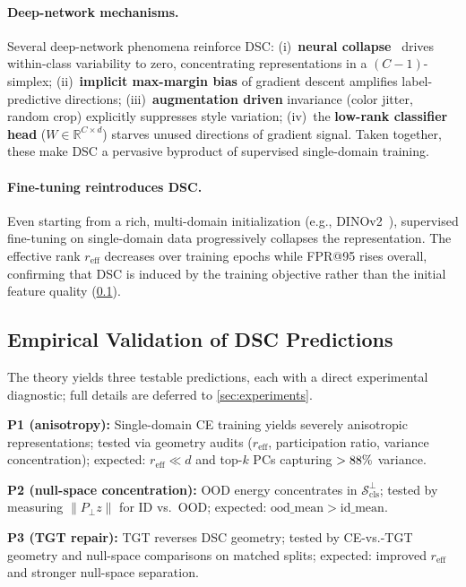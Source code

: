 \documentclass[runningheads]{llncs}
\begin{document}
\paragraph{Deep-network mechanisms.}
Several deep-network phenomena reinforce DSC:
(i)~\textbf{neural collapse}~\cite{Papyan2020nc} drives within-class variability to zero, concentrating representations in a $(C{-}1)$-simplex;
(ii)~\textbf{implicit max-margin bias} of gradient descent amplifies label-predictive directions;
(iii)~\textbf{augmentation driven} invariance (color jitter, random crop) explicitly suppresses style variation;
(iv)~the \textbf{low-rank classifier head} ($W \in \mathbb{R}^{C \times d}$) starves unused directions of gradient signal.
Taken together, these make DSC a pervasive byproduct of supervised single-domain training.

\paragraph{Fine-tuning reintroduces DSC.}
Even starting from a rich, multi-domain initialization (e.g., DINOv2~\cite{Oquab2024dinov2}), supervised fine-tuning on single-domain data progressively collapses the representation.
The effective rank $r_{\mathrm{eff}}$ decreases over training epochs while FPR@95 rises overall, confirming that DSC is induced by the training objective rather than the initial feature quality (\cref{sec:theory:empirical}).

\subsection{Empirical Validation of DSC Predictions}
\label{sec:theory:empirical}

The theory yields three testable predictions, each with a direct experimental diagnostic; full details are deferred to \cref{sec:experiments}.

\noindent\textbf{P1 (anisotropy):} Single-domain CE training yields severely anisotropic representations; tested via geometry audits ($r_{\mathrm{eff}}$, participation ratio, variance concentration); expected: $r_{\mathrm{eff}} \ll d$ and top-$k$ PCs capturing $>88\%$ variance.

\noindent\textbf{P2 (null-space concentration):} OOD energy concentrates in $\mathcal{S}_{\mathrm{cls}}^\perp$; tested by measuring $\|P_\perp z\|$ for ID vs.\ OOD; expected: $\mathrm{ood\_mean} > \mathrm{id\_mean}$.

\noindent\textbf{P3 (TGT repair):} TGT reverses DSC geometry; tested by CE-vs.-TGT geometry and null-space comparisons on matched splits; expected: improved $r_{\mathrm{eff}}$ and stronger null-space separation.
\end{document}
